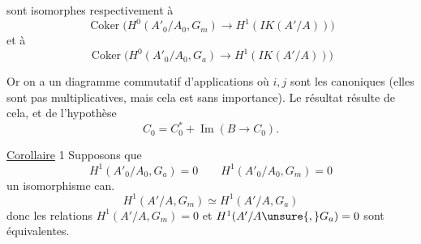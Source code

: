 sont isomorphes respectivement à
\[
\operatorname{Coker}\big(H^0(A'_0/A_0,G_m)\to H^1(IK(A'/A))\big)
\]
et à
\[
\operatorname{Coker}\big(H^0(A'_0/A_0,G_a)\to H^1(IK(A'/A))\big)
\]

Or on a un diagramme commutatif d'applications
où $i,j$ sont les  canoniques (elles
sont pas multiplicatives, mais cela est sans importance).
Le résultat résulte de cela, et de l'hypothèse
\[
C_0=C_0^*+\operatorname{Im}(B\to C_0).
\]

\uline{Corollaire} 1 Supposons que
\[
H^1(A'_0/A_0,G_a)=0\qquad H^1(A'_0/A_0,G_m)=0
\]
  un  isomorphisme can.
\[
H^1(A'/A,G_m)\simeq H^1(A'/A,G_a)
\]
donc les relations $H^1(A'/A,G_m)=0$ et
$H^1(A'/A\unsure{,}G_a)=0$ sont équivalentes.
